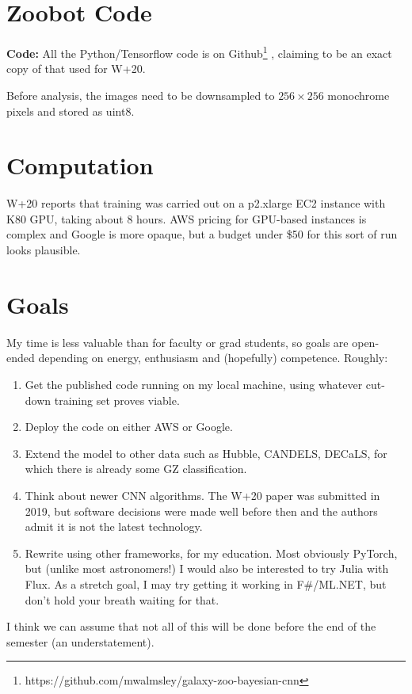 \documentclass[twocolumn, twocolappendix, tighten]{aastex631}
\begin{document}
\section{Zoobot Code} \label{sec:zcode}

\textbf{Code:} All the Python/Tensorflow code is on Github\footnote{https://github.com/mwalmsley/galaxy-zoo-bayesian-cnn} \citep{walmsley_mwalmsleygalaxy-zoo-bayesian-cnn_2019}, claiming to be an exact copy of that used for W+20.



Before analysis, the images need to be downsampled to $256 \times 256$ monochrome pixels and stored as uint8.

\section{Computation} \label{sec:comp}

W+20 reports that training was carried out on a p2.xlarge EC2 instance with K80 GPU, taking about 8 hours. AWS pricing for GPU-based instances is complex and Google is more opaque, but a budget under \$50 for this sort of run looks plausible.



\section{Goals} \label{sec:goals}

My time is less valuable than for faculty or grad students, so goals are open-ended depending on energy, enthusiasm and (hopefully) competence. Roughly:
\begin{enumerate}
	\item Get the published code running on my local machine, using whatever cut-down training set proves viable.
	\item Deploy the code on either AWS or Google.
	\item Extend the model to other data such as Hubble, CANDELS, DECaLS, for which there is already some GZ classification.
	\item Think about newer CNN algorithms. The W+20 paper was submitted in 2019, but software decisions were made well before then and the authors admit it is not the latest technology.
	\item Rewrite using other frameworks, for my education. Most obviously PyTorch, but (unlike most astronomers!) I would also be interested to try Julia with Flux. As a stretch goal, I may try getting it working in F\#/ML.NET, but don't hold your breath waiting for that.
\end{enumerate}

I think we can assume that not all of this will be done before the end of the semester (an understatement).



{}

\end{document}

